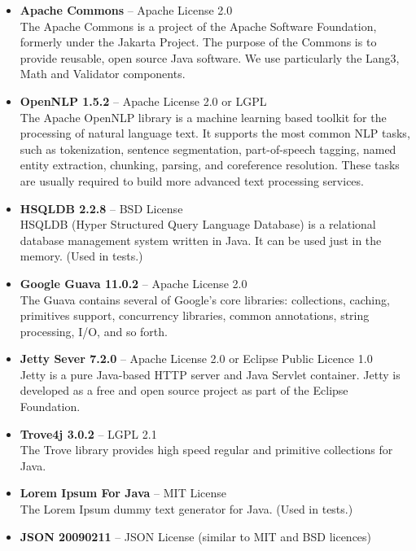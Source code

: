 \begin{itemize}
\item {\bf Apache Commons} -- Apache License 2.0 \\
The Apache Commons is a project of the Apache Software Foundation, formerly under the Jakarta Project. The purpose of the Commons is to provide reusable, open source Java software. We use particularly the Lang3, Math and Validator components.

\item {\bf OpenNLP 1.5.2} -- Apache License 2.0 or LGPL \\
The Apache OpenNLP library is a machine learning based toolkit for the processing of natural language text. It supports the most common NLP tasks, such as tokenization, sentence segmentation, part-of-speech tagging, named entity extraction, chunking, parsing, and coreference resolution. These tasks are usually required to build more advanced text processing services.

\item {\bf HSQLDB 2.2.8} -- BSD License \\
HSQLDB (Hyper Structured Query Language Database) is a relational database management system written in Java. It can be used just in the memory. (Used in tests.)

\item {\bf Google Guava 11.0.2} -- Apache License 2.0 \\
The Guava contains several of Google's core libraries: collections, caching, primitives support, concurrency libraries, common annotations, string processing, I/O, and so forth.

\item {\bf Jetty Sever 7.2.0} -- Apache License 2.0 or Eclipse Public Licence 1.0 \\
Jetty is a pure Java-based HTTP server and Java Servlet container. Jetty is developed as a free and open source project as part of the Eclipse Foundation.

\item {\bf Trove4j 3.0.2} -- LGPL 2.1 \\
The Trove library provides high speed regular and primitive collections for Java. 

\item {\bf Lorem Ipsum For Java} -- MIT License \\
The Lorem Ipsum dummy text generator for Java. (Used in tests.)

\item {\bf JSON 20090211} -- JSON License (similar to MIT and BSD licences)


\end{itemize}
